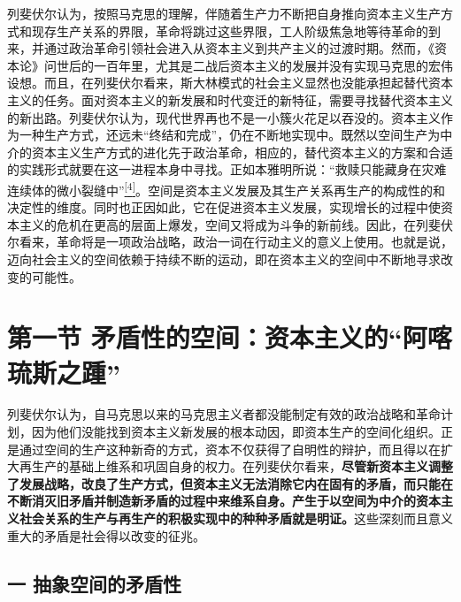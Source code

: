 \documentclass[UTF8, fontset = sourcesans, a4paper, oneside, zihao =
-4, scheme=chinese, no-math, space=true]{ctexbook}
\begin{document}
列斐伏尔认为，按照马克思的理解，伴随着生产力不断把自身推向资本主义生产方式和现存生产关系的界限，革命将跳过这些界限，工人阶级焦急地等待革命的到来，并通过政治革命引领社会进入从资本主义到共产主义的过渡时期。然而，《资本论》问世后的一百年里，尤其是二战后资本主义的发展并没有实现马克思的宏伟设想。而且，在列斐伏尔看来，斯大林模式的社会主义显然也没能承担起替代资本主义的任务。面对资本主义的新发展和时代变迁的新特征，需要寻找替代资本主义的新出路。列斐伏尔认为，现代世界再也不是一小簇火花足以吞没的。资本主义作为一种生产方式，还远未``终结和完成''，仍在不断地实现中。既然以空间生产为中介的资本主义生产方式的进化先于政治革命，相应的，替代资本主义的方案和合适的实践形式就要在这一进程本身中寻找。正如本雅明所说：``救赎只能藏身在灾难连续体的微小裂缝中''\protect\hypertarget{part0008_split_000.htmlux5cux23w4}{}{}\protect\hyperlink{part0008_split_003.htmlux5cux23m4}{\textsuperscript{{[}4{]}}}。空间是资本主义发展及其生产关系再生产的构成性的和决定性的维度。同时也正因如此，它在促进资本主义发展，实现增长的过程中使资本主义的危机在更高的层面上爆发，空间又将成为斗争的新前线。因此，在列斐伏尔看来，革命将是一项政治战略，政治一词在行动主义的意义上使用。也就是说，迈向社会主义的空间依赖于持续不断的运动，即在资本主义的空间中不断地寻求改变的可能性。

\protect\hypertarget{part0008_split_001.html}{}{}

\hypertarget{part0008_split_001.htmlux5cux23b011}{\section{\texorpdfstring{第一节
矛盾性的空间：资本主义的``阿喀琉斯之踵''}{第一节 矛盾性的空间：资本主义的阿喀琉斯之踵}}\label{part0008_split_001.htmlux5cux23b011}}

列斐伏尔认为，自马克思以来的马克思主义者都没能制定有效的政治战略和革命计划，因为他们没能找到资本主义新发展的根本动因，即资本生产的空间化组织。正是通过空间的生产这种新奇的方式，资本不仅获得了自明性的辩护，而且得以在扩大再生产的基础上维系和巩固自身的权力。在列斐伏尔看来，\textbf{尽管新资本主义调整了发展战略，改良了生产方式，但资本主义无法消除它内在固有的矛盾，而只能在不断消灭旧矛盾并制造新矛盾的过程中来维系自身。产生于以空间为中介的资本主义社会关系的生产与再生产的积极实现中的种种矛盾就是明证。}这些深刻而且意义重大的矛盾是社会得以改变的征兆。

\subsection{一
抽象空间的矛盾性}\label{part0008_split_001.htmlux5cux23c036}
\end{document}

